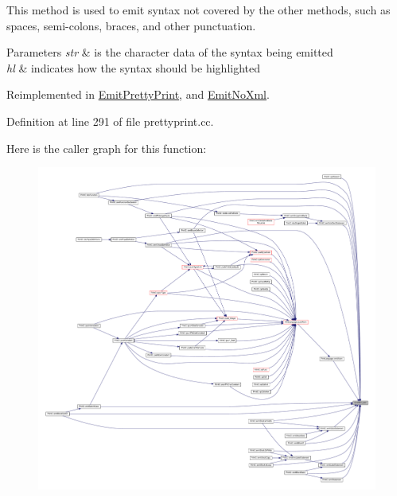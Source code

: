 This method is used to emit syntax not covered by the other methods, such as spaces, semi-\/colons, braces, and other punctuation. 
\begin{DoxyParams}{Parameters}
{\em str} & is the character data of the syntax being emitted \\
\hline
{\em hl} & indicates how the syntax should be highlighted \\
\hline
\end{DoxyParams}


Reimplemented in \mbox{\hyperlink{class_emit_pretty_print_ac0134af230be5c379fd8173a7e99fac7}{Emit\+Pretty\+Print}}, and \mbox{\hyperlink{class_emit_no_xml_a86cb933b199d3d3cd8823087c1fc1404}{Emit\+No\+Xml}}.



Definition at line 291 of file prettyprint.\+cc.

Here is the caller graph for this function\+:
\nopagebreak
\begin{figure}[H]
\begin{center}
\leavevmode
\includegraphics[width=350pt]{class_emit_xml_a287234536199377d46179762127875ac_icgraph}
\end{center}
\end{figure}
\mbox{\label{class_emit_xml_a51e2d9c79cebe75ed8e33bb7513d86cf}} 
